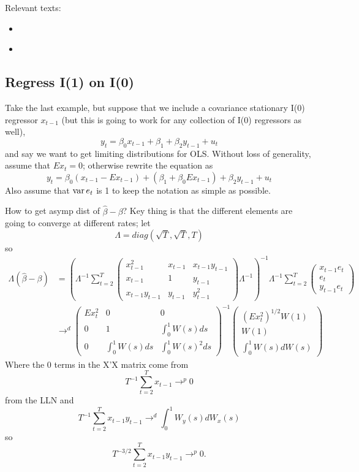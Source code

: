 Relevant texts:
\begin{itemize}
\item \citet{GN74}
\item \citet{Phi86}
\end{itemize}

\subsection{Regress I(1) on I(0)}

Take the last example, but suppose that we include a covariance
stationary I(0) regressor $x_{t-1}$ (but this is going to work for any
collection of I(0) regressors as well),
\[y_t = \beta_0 x_{t-1} + \beta_1 + \beta_2 y_{t-1} + u_t\] and say we want to get
limiting distributions for OLS. Without loss of generality, assume that
$E x_t = 0$; otherwise rewrite the equation as
\[y_t = \beta_0 (x_{t-1} - E x_{t-1}) + (\beta_1 + \beta_0 E x_{t-1}) + \beta_2 y_{t-1} + u_t\]
Also assume that $\operatorname{var} e_t$ is 1 to keep the notation as simple as
possible.

How to get asymp dist of $\hat \beta - \beta$? Key thing is that the different
elements are going to converge at different rates; let
\[\Lambda = diag(\sqrt{T}, \sqrt{T}, T)\] so
\begin{equation}
\begin{split}
  \Lambda (\hat \beta - \beta) &=  \left( \Lambda^{-1} \sum_{t=2}^T
    \begin{pmatrix}
      x_{t-1}^2       & x_{t-1}   & x_{t-1} y_{t-1} \\
      x_{t-1}         & 1         & y_{t-1} \\
      x_{t-1} y_{t-1} & y_{t-1}   & y_{t-1}^2
    \end{pmatrix} \Lambda^{-1} \right)^{-1}
  \Lambda^{-1} \sum_{t=2}^T
  \begin{pmatrix}
    x_{t-1} e_t \\ e_t \\ y_{t-1} e_t
  \end{pmatrix}\\
  & \to^d
  \begin{pmatrix}
    E x_t^2 & 0             & 0 \\
    0       & 1             & \int_0^1 W(s) ds \\
    0       & \int_0^1 W(s) ds & \int_0^1 W(s)^2 ds
  \end{pmatrix}^{-1}
  \begin{pmatrix} (E x_t^2)^{1/2} W(1) \\ W(1) \\ \int_0^1 W(s) dW(s) \end{pmatrix}
\end{split}
\end{equation}
Where the 0 terms in the X'X matrix come from
\[T^{-1} \sum_{t=2}^T x_{t-1} \to^p 0\] from the LLN and
\[T^{-1} \sum_{t=2}^T x_{t-1} y_{t-1} \to^d \int_0^1 W_y(s) dW_x(s)\] so
\[T^{-3/2} \sum_{t=2}^T x_{t-1} y_{t-1} \to^p 0.\]

